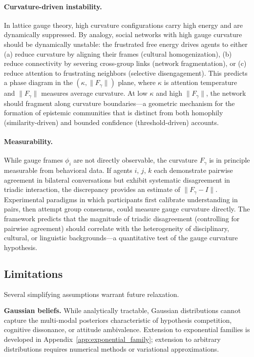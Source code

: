\documentclass[12pt]{article}
\begin{document}
\paragraph{Curvature-driven instability.} In lattice gauge theory, high curvature configurations carry high energy and are dynamically suppressed. By analogy, social networks with high gauge curvature should be dynamically unstable: the frustrated free energy drives agents to either (a) reduce curvature by aligning their frames (cultural homogenization), (b) reduce connectivity by severing cross-group links (network fragmentation), or (c) reduce attention to frustrating neighbors (selective disengagement). This predicts a phase diagram in the $(\kappa, \|F_\gamma\|)$ plane, where $\kappa$ is attention temperature and $\|F_\gamma\|$ measures average curvature. At low $\kappa$ and high $\|F_\gamma\|$, the network should fragment along curvature boundaries---a geometric mechanism for the formation of epistemic communities that is distinct from both homophily (similarity-driven) and bounded confidence (threshold-driven) accounts.

\paragraph{Measurability.} While gauge frames $\phi_i$ are not directly observable, the curvature $F_\gamma$ is in principle measurable from behavioral data. If agents $i$, $j$, $k$ each demonstrate pairwise agreement in bilateral conversations but exhibit systematic disagreement in triadic interaction, the discrepancy provides an estimate of $\|F_\gamma - I\|$. Experimental paradigms in which participants first calibrate understanding in pairs, then attempt group consensus, could measure gauge curvature directly. The framework predicts that the magnitude of triadic disagreement (controlling for pairwise agreement) should correlate with the heterogeneity of disciplinary, cultural, or linguistic backgrounds---a quantitative test of the gauge curvature hypothesis.

\subsection{Limitations}

Several simplifying assumptions warrant future relaxation.

\textbf{Gaussian beliefs.} While analytically tractable, Gaussian distributions cannot capture the multi-modal posteriors characteristic of hypothesis competition, cognitive dissonance, or attitude ambivalence. Extension to exponential families is developed in Appendix~\ref{app:exponential_family}; extension to arbitrary distributions requires numerical methods or variational approximations.
\end{document}
